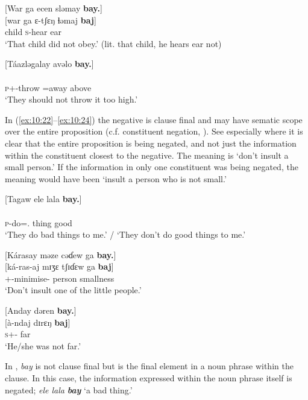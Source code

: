 \ea \label{ex:10:20}
{}[War  ga  ecen  sləmay  \textbf{bay.}]\\
\gll  {}[war  ga  ɛ{}-tʃɛŋ  ɬəmaj  \textbf{baj}]\\
      child  {\ADJ}  \textsc{s}-hear  ear  {\NEG}\\
\glt  ‘That child did not obey.’ (lit. that child, he hears ear not)
\z

\ea \label{ex:10:21}
[Táazləgalay  avəlo  \textbf{bay.}]\\
\gll  [táá-ɮəg    =alaj    avʊlɔ  \textbf{baj}]\\
      \textsc{p}+{\POT}-throw   =away    above  {\NEG}\\
\glt  ‘They should not throw it too high.’
\z

In (\ref{ex:10:22}--\ref{ex:10:24}) the negative is clause final and may have sematic scope over the entire proposition (c.f. constituent negation, ). See especially  where it is clear that the entire proposition is being negated, and not just the information within the constituent closest to the negative. The meaning is ‘don’t insult a small person.’ If the information in only one constituent was being negated, the meaning would have been ‘insult a person who is not small.’

\ea \label{ex:10:22}
[Tagaw  ele  lala  \textbf{bay.}]\\
\gll  [ta-g=aw    ɛlɛ   lala  \textbf{baj}]\\
      \textsc{p}-do={\oneS}.{\IO}   thing  good  {\NEG}\\
\glt  ‘They do bad things to me.’ / ‘They don’t do good things to me.’ 
\z

\ea \label{ex:10:23}
{}[Kárasay  məze  cəɗew  ga  \textbf{bay.}]\\
\gll  {}[ká-ras-aj     mɪʒɛ   tʃɪɗɛw     ga   \textbf{baj}]\\
      {\twoS}+{\IFV}-minimise{}-{\CL}  person  smallness  {\ADJ}  {\NEG}\\
\glt  ‘Don’t insult one of the little people.’ 
\z

\ea \label{ex:10:24}
{}[Anday  dəren \textbf{bay.}]\\
\gll  {}[à-ndaj    dɪrɛŋ  \textbf{baj}]\\
      \textsc{s}+{\PFV}-{\PRG}  far  {\NEG}\\
\glt  ‘He/she was not far.’  
\z

In , \textit{bay} is not clause final but is the final element in a noun phrase within the clause. In this case, the information expressed within the noun phrase itself is negated; \textit{ele lala} \textbf{\textit{bay}} ‘a bad thing.’ 

